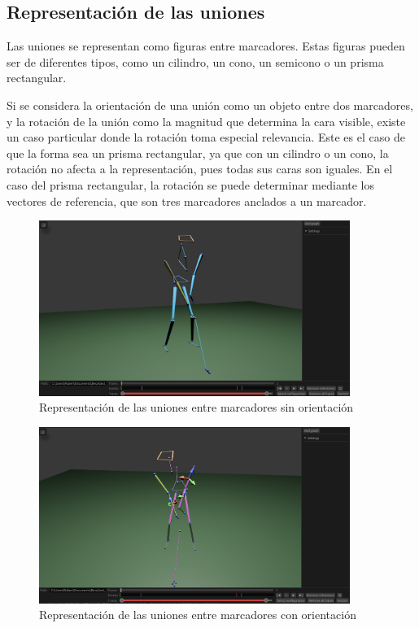 \subsection{Representación de las uniones} \label{sec:representacion-uniones}

Las uniones se representan como figuras entre marcadores. Estas figuras pueden ser de diferentes tipos, como un cilindro, un cono, un semicono o un prisma rectangular.

Si se considera la orientación de una unión como un objeto entre dos marcadores, y la rotación de la unión como la magnitud que determina la cara visible, existe un caso particular donde la rotación toma especial relevancia. Este es el caso de que la forma sea un prisma rectangular, ya que con un cilindro o un cono, la rotación no afecta a la representación, pues todas sus caras son iguales. En el caso del prisma rectangular, la rotación se puede determinar mediante los vectores de referencia, que son tres marcadores anclados a un marcador. 


\begin{figure}[H]
  \centering
  \includegraphics[width=0.9\textwidth]{imagenes/uniones-cilindros.png}
  \caption{Representación de las uniones entre marcadores sin orientación}
  \label{fig:uniones-cilindros}
\end{figure}


\begin{figure}[H]
  \centering
  \includegraphics[width=0.9\textwidth]{imagenes/uniones-prisma.png}
  \caption{Representación de las uniones entre marcadores con orientación}
  \label{fig:uniones-prisma}
\end{figure}


